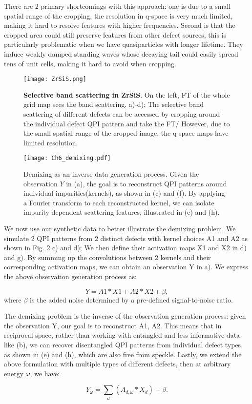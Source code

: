 There are 2 primary shortcomings with this approach: one is due to a small spatial range of the cropping, the resolution in q-space is very much limited, making it hard to resolve features with higher frequencies. Second is that the cropped area could still preserve features from other defect sources, this is particularly problematic when we have quasiparticles with longer lifetime. They induce weakly damped standing waves whose decaying tail could easily spread tens of unit cells, making it hard to avoid when cropping. 

\begin{figure}
	\texttt{[image: ZrSiS.png]} 
	\centering
	\caption[Selective band scattering in ZrSiS]{\textbf{Selective band scattering in ZrSiS}. On the left, \ac{FT} of the whole grid map sees the band scattering. a)-d): The selective band scattering of different defects can be accessed by cropping around the individual defect QPI pattern and take the \ac{FT}/ However, due to the small spatial range of the cropped image, the q-space maps have limited resolution.}
	\label{fig:ch6_ZrSiS}
\end{figure}

\begin{figure}
	\texttt{[image: Ch6\_demixing.pdf]} 
	\centering
	\caption{Demixing as an inverse data generation process. Given the observation 
		$Y$ in (a), the goal is to reconstruct QPI patterns around individual impurities(kernels), as shown in (c) and (f). By applying a Fourier transform to each reconstructed kernel, we can isolate impurity-dependent scattering features, illustrated in (e) and (h).}
	\label{fig:ch6_demix}
\end{figure}

We now use our synthetic data to better illustrate the demixing problem. We simulate 2 \ac{QPI} patterns from 2 distinct defects with kernel choices A1 and A2 as shown in Fig. \ref{fig:ch6_demix} c) and d); We then define their activation maps X1 and X2 in d) and g). By summing up the convolutions between 2 kernels and their corresponding activation maps, we can obtain an observation Y in a). We express the above observation generation process as:

\begin{equation}
	Y = A1 * X1 + A2 * X2 + \beta, 
\end{equation}
where $\beta$ is the added noise determined by a pre-defined signal-to-noise ratio.

The demixing problem is the inverse of the observation generation process: given the observation Y, our goal is to reconstruct A1, A2. This means that in reciprocal space, rather than working with entangled and less informative data like (b), we can recover disentangled QPI patterns from individual defect types, as shown in (e) and (h), which are also free from speckle. Lastly, we extend the above formulation with multiple types of different defects, then at arbitrary energy $\omega$, we have: 

\begin{equation}
	\label{eq:demixing}
	Y_{\omega} = \sum_d ( A_{d,{\omega}} * X_d) + \beta. 
\end{equation} 



